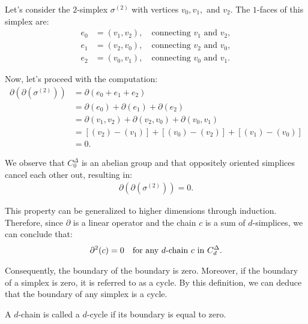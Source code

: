 \begin{example}
Let's consider the \(2\)-simplex \( \sigma^{(2)} \) with vertices \( v_{0}, v_{1}, \) and \( v_{2} \). The \( 1 \)-faces of this simplex are:
\begin{align}
e_{0} &= (v_{1}, v_{2}), \quad \text{connecting } v_{1} \text{ and } v_{2}, \\
e_{1} &= (v_{2}, v_{0}), \quad \text{connecting } v_{2} \text{ and } v_{0}, \\
e_{2} &= (v_{0}, v_{1}), \quad \text{connecting } v_{0} \text{ and } v_{1}.
\end{align}

Now, let's proceed with the computation:
\begin{align}
\partial(\partial(\sigma^{(2)})) &= \partial(e_{0} + e_{1} + e_{2}) \\
&= \partial(e_{0}) + \partial(e_{1}) + \partial(e_{2}) \\
&= \partial(v_{1}, v_{2}) + \partial(v_{2}, v_{0}) + \partial(v_{0}, v_{1}) \\
&= [(v_{2}) - (v_{1})] + [(v_{0}) - (v_{2})] + [(v_{1}) - (v_{0})] \\
&= 0.
\end{align}

We observe that \( C^{\Delta}_{0} \) is an abelian group and that oppositely oriented simplices cancel each other out, resulting in:
\begin{align}
\partial(\partial(\sigma^{(2)})) = 0.
\end{align}

This property can be generalized to higher dimensions through induction. Therefore, since \( \partial \) is a linear operator and the chain \( c \) is a sum of \( d \)-simplices, we can conclude that:
\begin{align}
\partial^{2}(c) = 0 \quad \text{for any \( d \)-chain \( c \) in } C^{\Delta}_{d}.
\end{align}

Consequently, the boundary of the boundary is zero. Moreover, if the boundary of a simplex is zero, it is referred to as a cycle. By this definition, we can deduce that the boundary of any simplex is a cycle.
\end{example}

\begin{definition}[$d$-Cycle]{\cite[p.106]{hatcher2005algebraic}}
A $d$-chain is called a $d$-cycle if its boundary is equal to zero.
\end{definition}

